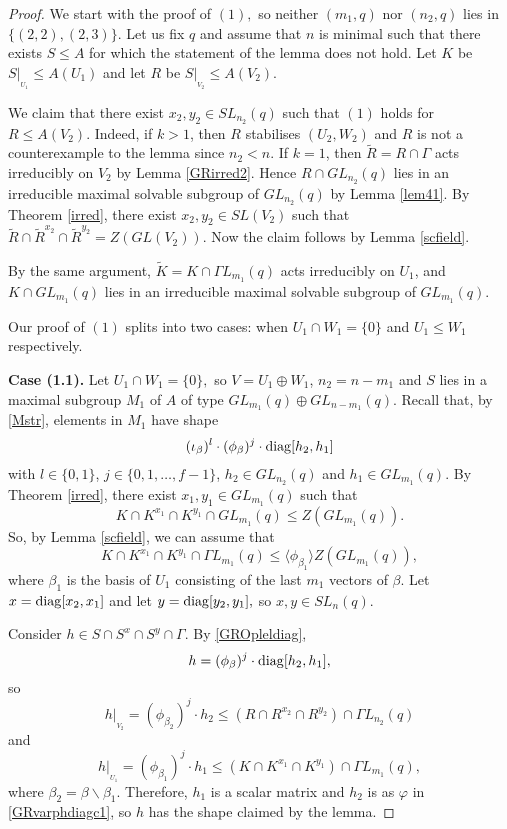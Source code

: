 \begin{proof}
We start with the proof of $(1),$ so neither $(m_1,q)$ nor $(n_2,q)$ lies in $\{(2,2), (2,3)\}.$ 
Let us fix $q$ and assume that $n$ is minimal such that there exists $S\le A$ for which the statement of the lemma does not hold. Let $K$ be $S|_{_{U_1}} \le A(U_1)$ and let $R$ be $S|_{_{V_2}} \le A(V_2).$

We claim that there exist $x_2, y_2 \in SL_{n_2}(q)$ such that $(1)$ holds for $R \le A(V_2)$. Indeed, if $k>1$, then $R$ stabilises $(U_2,W_2)$ and $R$ is not a counterexample to the lemma since $n_2<n.$ If $k=1$, then $\tilde{R}=R \cap \Gamma$ acts irreducibly on $V_2$ by Lemma \ref{GRirred2}.  Hence $R \cap GL_{n_2}(q)$ lies in an irreducible maximal solvable subgroup of $GL_{n_2}(q)$ by  Lemma \ref{lem41}. By Theorem \ref{irred}, there exist $x_2,y_2 \in SL(V_2)$ such that $\tilde{R} \cap \tilde{R}^{x_2} \cap \tilde{R}^{y_2}= Z(GL(V_2)).$ Now the claim follows by Lemma \ref{scfield}.

By the same argument, $\tilde{K}=K \cap \Gamma L_{m_1}(q)$ acts irreducibly on $U_1$, and $K \cap GL_{m_1}(q)$ lies in an irreducible maximal solvable subgroup of $GL_{m_1}(q)$.

Our proof of $(1)$ splits into two cases: when $U_1\cap W_1=\{0\}$ and $U_1 \le W_1$ respectively.
\medskip

{\bf Case (1.1).} Let $U_1 \cap W_1= \{0\},$ so $V=U_1 \oplus W_1$, $n_2=n-m_1$ and $S$ lies in a maximal subgroup $M_1$ of $A$ of type $GL_{m_1}(q) \oplus GL_{n-m_1}(q).$ Recall that, by \eqref{Mstr}, elements in $M_1$ have shape 
\begin{equation}
\label{GROpleldiag}
(\iota_{\beta})^l \cdot (\phi_{\beta})^j \cdot \mathrm{diag}[h_2, h_1]
\end{equation}
with $l \in \{0,1\}$, $j \in \{0, 1, \ldots, f-1\}$, $h_2 \in GL_{n_2}(q)$ and $h_1 \in GL_{m_1}(q).$   By Theorem \ref{irred}, there exist $x_1, y_1 \in GL_{m_1}(q)$ such that 
$$K \cap K^{x_1} \cap K^{y_1} \cap GL_{m_1}(q) \le Z(GL_{m_1}(q)).$$ So, by Lemma \ref{scfield}, we can assume that $$K \cap K^{x_1} \cap K^{y_1} \cap  \Gamma L_{m_1}(q) \le \langle \phi_{\beta_1} \rangle Z(GL_{m_1}(q)),$$ where $\beta_1$ is the basis of $U_1$ consisting of the last $m_1$ vectors of $\beta.$ Let $x=\mathrm{diag}[x_2, x_1]$ and let $y=\mathrm{diag}[y_2, y_1],$ so $x,y \in SL_n(q).$

Consider $h \in S \cap S^x \cap S^y \cap \Gamma.$ By \eqref{GROpleldiag},
$$h= (\phi_{\beta})^j \cdot \mathrm{diag}[h_2,h_1],$$ so
$$h|_{_{V_2}}=(\phi_{\beta_2})^j \cdot h_2 \le (R \cap R^{x_2} \cap R^{y_2}) \cap \Gamma L_{n_2}(q)$$ and 
$$h|_{_{U_1}}=(\phi_{\beta_1})^j \cdot h_1 \le (K \cap K^{x_1} \cap K^{y_1}) \cap \Gamma L_{m_1}(q),$$ 
where $\beta_2=\beta \backslash \beta_1.$ Therefore, $h_1$ is a scalar matrix and  $h_2$ is as $\varphi$ in \eqref{GRvarphdiagc1}, so $h$ has the shape claimed by the lemma.


\end{proof}

